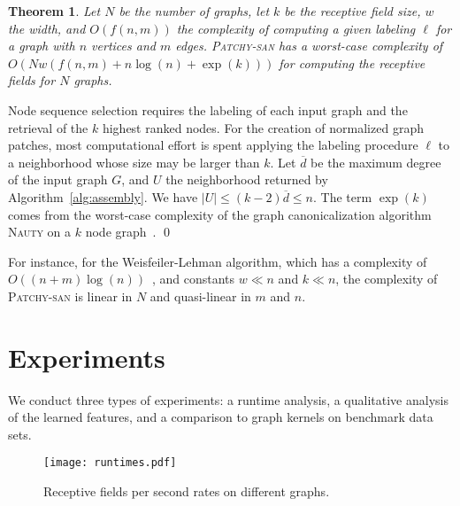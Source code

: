 \documentclass{article}
\newtheorem{thmx}{Theorem}
\renewenvironment{proof}{{\bf Proof:}}{\qed}
\newcommand{\nauty}{{\textsc{Nauty}}\xspace}
\begin{document}
\begin{thmx}
Let $N$ be the number of graphs, let $k$ be the receptive field size, $w$ the width, and $O(f(n,m))$ the complexity of computing a given labeling $\ell$ for a graph with $n$ vertices and $m$ edges. \textsc{Patchy-san} has a worst-case complexity of $O(N w (f(n,m)+ n\log(n) + \exp(k)))$ for computing the receptive fields for $N$ graphs.
\end{thmx}
\begin{proof}
Node sequence selection requires the labeling of each input graph and the retrieval of the $k$ highest ranked nodes. For the creation of normalized graph patches, most computational effort is spent applying the labeling procedure $\ell$ to a neighborhood whose size may be larger than $k$. Let $\overline{d}$ be the maximum degree of the input graph $G$, and $U$ the neighborhood returned by Algorithm~\ref{alg:assembly}. We have $|U| \leq (k-2) \overline{d} \leq n$.
The term $\exp(k)$ comes from the worst-case complexity of the graph canonicalization algorithm \nauty on a $k$ node graph~\cite{miyazaki:1997}. 
\end{proof} 

For instance, for the Weisfeiler-Lehman algorithm, which has a complexity of  $O((n+m) \log(n))$~\cite{Berkholz:2013}, and constants $w \ll n$ and $k \ll n$, the complexity of \textsc{Patchy-san} is linear in $N$ and quasi-linear in $m$ and $n$. 







\section{Experiments}
We conduct three types of experiments: a runtime analysis, a qualitative analysis of the learned features, and a comparison to graph kernels on benchmark data sets. 

\begin{figure}
\texttt{[image: runtimes.pdf]}
\caption{\label{fig-runtime} Receptive fields per second rates on different graphs.}
\end{figure}
\end{document}
